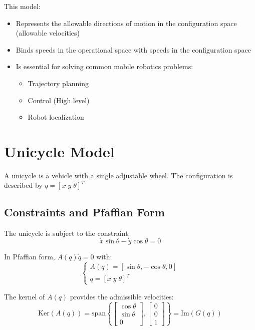 \documentclass[openany]{book}
\theoremstyle{definition}
\theoremstyle{remark}
\newcommand{\definitionbox}[1]{
\begin{tcolorbox}[colback=blue!5,colframe=blue!40!black,title=Definition]
 #1
\end{tcolorbox}
}
\begin{document}
This model:
\begin{itemize}
    \item Represents the allowable directions of motion in the configuration space (allowable velocities)
    \item Binds speeds in the operational space with speeds in the configuration space
    \item Is essential for solving common mobile robotics problems:
    \begin{itemize}
        \item Trajectory planning
        \item Control (High level)
        \item Robot localization
    \end{itemize}
\end{itemize}

\section{Unicycle Model}

\definitionbox{A unicycle is a vehicle with a single adjustable wheel. The configuration is described by $q = [x \; y \; \theta]^T$}

\subsection{Constraints and Pfaffian Form}
The unicycle is subject to the constraint:
\begin{equation}
    \dot{x} \sin \theta - \dot{y} \cos \theta = 0
\end{equation}

In Pfaffian form, $A(q)\dot{q} = 0$ with:
\begin{equation}
    \begin{cases}
        A(q) = [\sin \theta, -\cos \theta, 0] \\
        q = [x \; y \; \theta]^T
    \end{cases}
\end{equation}

The kernel of $A(q)$ provides the admissible velocities:
\begin{equation}
    \text{Ker}(A(q)) = \text{span}\left\{\begin{bmatrix}\cos \theta\\\sin \theta\\0\end{bmatrix}, \begin{bmatrix}0\\0\\1\end{bmatrix}\right\} = \text{Im}(G(q))
\end{equation}
\end{document}
